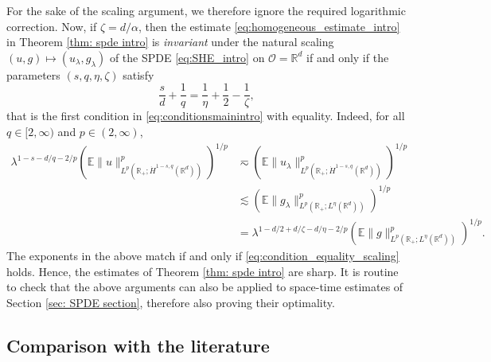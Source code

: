 \documentclass[reqno]{amsart}
\theoremstyle{plain}
\theoremstyle{remark}
\theoremstyle{plain}
\numberwithin{equation}{section}
\newcommand\cO{\mathcal{O}}
\def\R{{\mathbb R}}
\newcommand{\E}{{\mathbb E}}
\newcommand{\1}{\one}
\begin{document}
For the sake of the scaling argument, we therefore ignore the required logarithmic correction. 
Now, if $\zeta=d/\alpha$, then the estimate \eqref{eq:homogeneous_estimate_intro} in Theorem \ref{thm: spde intro} is \emph{invariant} under the natural scaling $(u,g)\mapsto (u_\lambda,g_\lambda)$ of the SPDE \eqref{eq:SHE_intro} on $\cO=\R^d$ if and only if the parameters $(s,q,\eta,\zeta)$ satisfy 
\begin{equation}
\label{eq:condition_equality_scaling}
\frac{s}{d}+\frac{1}{q} = \frac{1}{\eta}+\frac12 -\frac{1}{\zeta},
\end{equation}
that is the first condition in \eqref{eq:conditionsmainintro} with equality. 
Indeed, for all $q\in [2,\infty)$ and $p\in (2,\infty)$,
\begin{align*}
\lambda^{1-s-d/q-2/p}
(\E\|u\|_{L^p(\R_+;\dot{H}^{1-s,q}(\R^d))}^p)^{1/p}
& \eqsim 
(\E\|u_{\lambda}\|_{L^p(\R_+;\dot{H}^{1-s,q}(\R^d))}^p)^{1/p}\\
&\lesssim
 (\E\|g_\lambda\|_{L^p(\R_+;L^\eta(\R^d))}^p)^{1/p}\\
& =\lambda^{1-d/2+d/\zeta-d/\eta-2/p} (\E\|g\|_{L^p(\R_+;L^\eta(\R^d))}^p)^{1/p}.
\end{align*}
The exponents in the above match if and only if \eqref{eq:condition_equality_scaling} holds. Hence, the estimates of Theorem \ref{thm: spde intro} are sharp. It is routine to check that the above arguments can also be applied to space-time estimates of Section \ref{sec: SPDE section}, therefore also proving their optimality. 


\subsection{Comparison with the literature}
\label{ss:comparison_intro}
 
\end{document}
